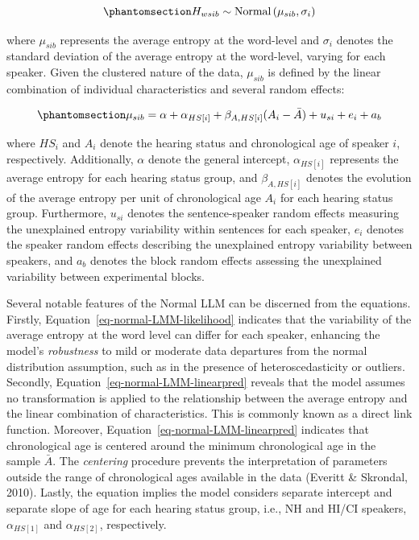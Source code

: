 \documentclass[
]{agujournal2019}
\begin{document}
\begin{equation}\phantomsection\label{eq-normal-LMM-likelihood}{
H_{wsib} \sim \text{Normal} \left( \mu_{sib}, \sigma_{i} \right)
}\end{equation}

where \(\mu_{sib}\) represents the average entropy at the word-level and
\(\sigma_{i}\) denotes the standard deviation of the average entropy at
the word-level, varying for each speaker. Given the clustered nature of
the data, \(\mu_{sib}\) is defined by the linear combination of
individual characteristics and several random effects:

\begin{equation}\phantomsection\label{eq-normal-LMM-linearpred}{
\mu_{sib} = \alpha + \alpha_{HS[i]} + \beta_{A, HS[i]} (A_{i} - \bar{A}) + u_{si} + e_{i} + a_{b}
}\end{equation}

where \(HS_{i}\) and \(A_{i}\) denote the hearing status and
chronological age of speaker \(i\), respectively. Additionally,
\(\alpha\) denote the general intercept, \(\alpha_{HS[i]}\) represents
the average entropy for each hearing status group, and
\(\beta_{A,HS[i]}\) denotes the evolution of the average entropy per
unit of chronological age \(A_{i}\) for each hearing status group.
Furthermore, \(u_{si}\) denotes the sentence-speaker random effects
measuring the unexplained entropy variability within sentences for each
speaker, \(e_{i}\) denotes the speaker random effects describing the
unexplained entropy variability between speakers, and \(a_{b}\) denotes
the block random effects assessing the unexplained variability between
experimental blocks.

Several notable features of the Normal LLM can be discerned from the
equations. Firstly, Equation~\ref{eq-normal-LMM-likelihood} indicates
that the variability of the average entropy at the word level can differ
for each speaker, enhancing the model's \emph{robustness} to mild or
moderate data departures from the normal distribution assumption, such
as in the presence of heteroscedasticity or outliers. Secondly,
Equation~\ref{eq-normal-LMM-linearpred} reveals that the model assumes
no transformation is applied to the relationship between the average
entropy and the linear combination of characteristics. This is commonly
known as a direct link function. Moreover,
Equation~\ref{eq-normal-LMM-linearpred} indicates that chronological age
is centered around the minimum chronological age in the sample
\(\bar{A}\). The \emph{centering} procedure prevents the interpretation
of parameters outside the range of chronological ages available in the
data (Everitt \& Skrondal, 2010). Lastly, the equation implies the model
considers separate intercept and separate slope of age for each hearing
status group, i.e., NH and HI/CI speakers, \(\alpha_{HS[1]}\) and
\(\alpha_{HS[2]}\), respectively.
\end{document}
